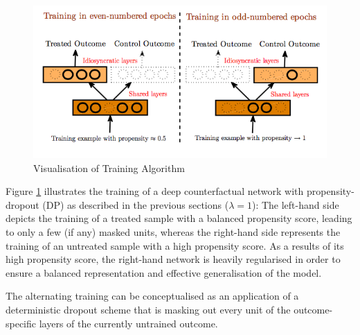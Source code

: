 \begin{figure}[h]
	\centering
	\includegraphics[width=1.0\textwidth]{figures/chapter-3/pbd-training.png}
	\caption{Visualisation of Training Algorithm}\label{fig:dcn-training}
\end{figure}
Figure \ref{fig:dcn-training} illustrates the training of a deep counterfactual network with propensity-dropout (DP) as described in the previous sections ($\lambda = 1$):  The left-hand side depicts the training of a treated sample with a balanced propensity score, leading to only a few (if any) masked units, whereas the right-hand side represents the training of an untreated sample with a high propensity score. As a results of its high propensity score, the right-hand network is heavily regularised in order to ensure a balanced representation and effective generalisation of the model. 

The alternating training can be conceptualised as an application of a deterministic dropout scheme that is masking out every unit of the outcome-specific layers of the currently untrained outcome.



